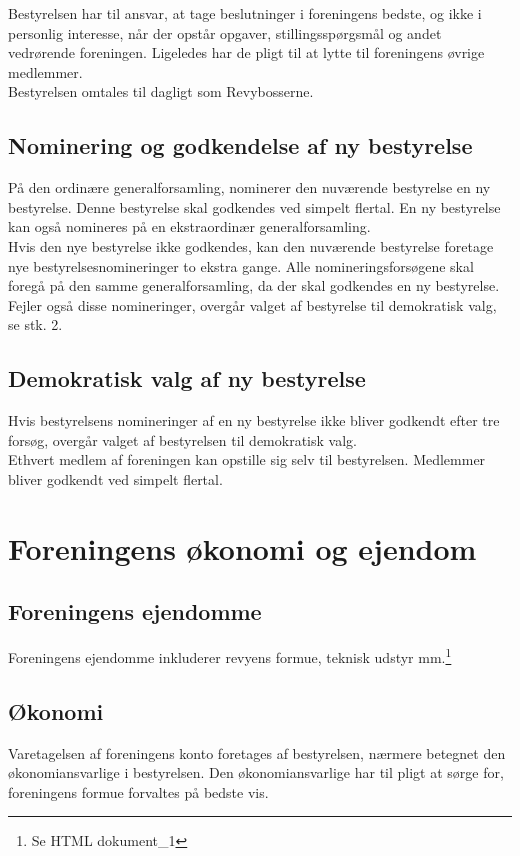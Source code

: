 \documentclass[a4paper,11pt,danish]{article}
\begin{document}
\noindent Bestyrelsen har til ansvar, at tage beslutninger i foreningens bedste,
og ikke i personlig interesse, når der opstår opgaver, stillingsspørgsmål og
andet vedrørende foreningen. Ligeledes har de pligt til at lytte til foreningens
øvrige medlemmer. \\

\noindent Bestyrelsen omtales til dagligt som Revybosserne.

\subsection{Nominering og godkendelse af ny bestyrelse}
På den ordinære generalforsamling, nominerer den nuværende bestyrelse en ny
bestyrelse.  Denne bestyrelse skal godkendes ved simpelt flertal.  En ny
bestyrelse kan også nomineres på en ekstraordinær generalforsamling.\\

\noindent Hvis den nye bestyrelse ikke godkendes, kan den nuværende bestyrelse
foretage nye bestyrelsesnomineringer to ekstra gange.  Alle nomineringsforsøgene
skal foregå på den samme generalforsamling, da der skal godkendes en ny
bestyrelse. Fejler også disse nomineringer, overgår valget af bestyrelse til demokratisk valg, se stk. 2.

\subsection{Demokratisk valg af ny bestyrelse}
Hvis bestyrelsens nomineringer af en ny bestyrelse ikke bliver godkendt efter
tre forsøg, overgår valget af bestyrelsen til demokratisk valg.\\

\noindent Ethvert medlem af foreningen kan opstille sig selv til bestyrelsen.
Medlemmer bliver godkendt ved simpelt flertal.

\section{Foreningens økonomi og ejendom}
\subsection{Foreningens ejendomme}
Foreningens ejendomme inkluderer revyens formue, teknisk udstyr
mm.\footnote{Se HTML dokument\_1}

\subsection{Økonomi}
Varetagelsen af foreningens konto foretages af bestyrelsen, nærmere betegnet den
økonomiansvarlige i bestyrelsen. Den økonomiansvarlige har til pligt at sørge
for, foreningens formue forvaltes på bedste vis. \\
\end{document}
